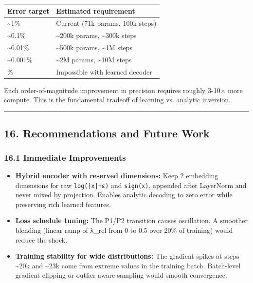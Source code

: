 \documentclass[11pt]{article}
\begin{document}
\begin{longtable}{|>{\raggedright\arraybackslash}p{}|>{\raggedright\arraybackslash}p{}|}
\hline
\textbf{Error target} & \textbf{Estimated requirement} \\ \hline
\textasciitilde{}1\% & Current (71k params, 100k steps) \\ \hline
\textasciitilde{}0.1\% & \textasciitilde{}200k params, \textasciitilde{}300k steps \\ \hline
\textasciitilde{}0.01\% & \textasciitilde{}500k params, \textasciitilde{}1M steps \\ \hline
\textasciitilde{}0.001\% & \textasciitilde{}2M params, \textasciitilde{}10M steps \\ \hline
0\% & Impossible with learned decoder \\ \hline
\end{longtable}


Each order-of-magnitude improvement in precision requires roughly 3-10× more compute. This is the fundamental tradeoff of learning vs. analytic inversion.


\noindent\rule{\textwidth}{0.4pt}


\subsection*{16. Recommendations and Future Work}


\subsubsection*{16.1 Immediate Improvements}


\begin{itemize}
\item \textbf{Hybrid encoder with reserved dimensions:} Keep 2 embedding dimensions for raw \texttt{log(|x|+ε)} and \texttt{sign(x)}, appended after LayerNorm and never mixed by projection. Enables analytic decoding to zero error while preserving rich learned features.
\item \textbf{Loss schedule tuning:} The P1/P2 transition causes oscillation. A smoother blending (linear ramp of λ\_rel from 0 to 0.5 over 20\% of training) would reduce the shock.
\item \textbf{Training stability for wide distributions:} The gradient spikes at steps \textasciitilde{}20k and \textasciitilde{}23k come from extreme values in the training batch. Batch-level gradient clipping or outlier-aware sampling would smooth convergence.
\end{itemize}
\end{document}
